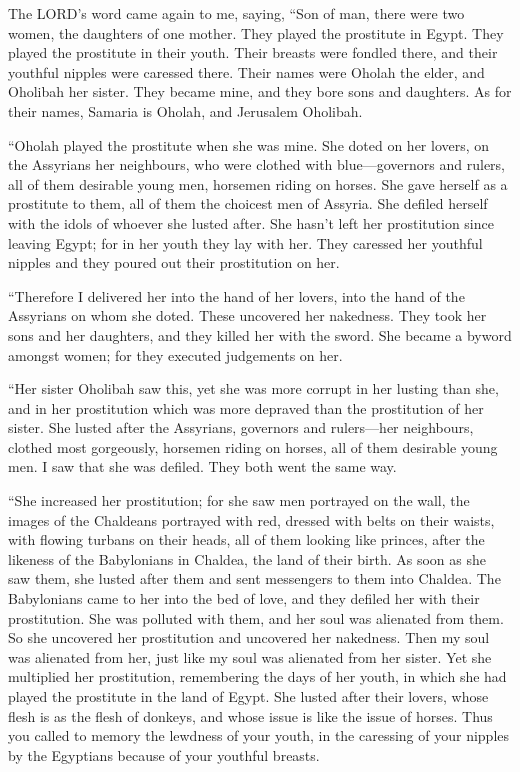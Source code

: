  The LORD's word came again to me, saying, 
``Son of man, there were two women, the daughters of one mother.
 They played the prostitute in Egypt. They played the
prostitute in their youth. Their breasts were fondled there, and their
youthful nipples were caressed there.  Their names were
Oholah the elder, and Oholibah her sister. They became mine, and they
bore sons and daughters. As for their names, Samaria is Oholah, and
Jerusalem Oholibah.

 ``Oholah played the prostitute when she was mine. She
doted on her lovers, on the Assyrians her neighbours,  who
were clothed with blue---governors and rulers, all of them desirable
young men, horsemen riding on horses.  She gave herself as
a prostitute to them, all of them the choicest men of Assyria. She
defiled herself with the idols of whoever she lusted after.
 She hasn't left her prostitution since leaving Egypt; for
in her youth they lay with her. They caressed her youthful nipples and
they poured out their prostitution on her.

 ``Therefore I delivered her into the hand of her lovers,
into the hand of the Assyrians on whom she doted.  These
uncovered her nakedness. They took her sons and her daughters, and they
killed her with the sword. She became a byword amongst women; for they
executed judgements on her.

 ``Her sister Oholibah saw this, yet she was more corrupt
in her lusting than she, and in her prostitution which was more depraved
than the prostitution of her sister.  She lusted after
the Assyrians, governors and rulers---her neighbours, clothed most
gorgeously, horsemen riding on horses, all of them desirable young men.
 I saw that she was defiled. They both went the same way.

 ``She increased her prostitution; for she saw men
portrayed on the wall, the images of the Chaldeans portrayed with red,
 dressed with belts on their waists, with flowing turbans
on their heads, all of them looking like princes, after the likeness of
the Babylonians in Chaldea, the land of their birth.  As
soon as she saw them, she lusted after them and sent messengers to them
into Chaldea.  The Babylonians came to her into the bed
of love, and they defiled her with their prostitution. She was polluted
with them, and her soul was alienated from them.  So she
uncovered her prostitution and uncovered her nakedness. Then my soul was
alienated from her, just like my soul was alienated from her sister.
 Yet she multiplied her prostitution, remembering the
days of her youth, in which she had played the prostitute in the land of
Egypt.  She lusted after their lovers, whose flesh is as
the flesh of donkeys, and whose issue is like the issue of horses.
 Thus you called to memory the lewdness of your youth, in
the caressing of your nipples by the Egyptians because of your youthful
breasts.

